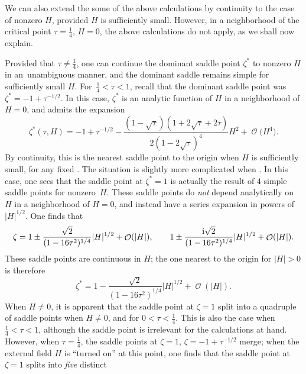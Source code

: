 \documentclass[pdftex]{sigma}
\DeclareMathOperator{\OO}{\mathcal{O}}
\numberwithin{equation}{section}
\begin{document}
\begin{Remark}
 We can also extend the some of the above calculations by continuity to the case of nonzero $H$, provided $H$ is sufficiently small. However, in a neighborhood of the critical point $\tau=\frac{1}{4}$, $H=0$, the above calculations do not apply, as we shall now explain.

 Provided that $\tau\neq \frac{1}{4}$, one can continue the dominant saddle point $\zeta^*$ to nonzero $H$ in an~unambiguous manner, and the dominant saddle remains simple for sufficiently small $H$. For~${\frac{1}{4}< \tau < 1}$,
 recall that the dominant saddle point was $\zeta^* = -1 + \tau^{-1/2}$. In this case, $\zeta^*$ is an analytic function of $H$ in a neighborhood of $H=0$, and admits the expansion
 \begin{equation*}
 \zeta^*(\tau,H) = -1 + \tau^{-1/2} - \frac{(1-\sqrt{\tau})(1+2\sqrt{\tau}+2\tau)}{2(1-2\sqrt{\tau})^4}H^2 + \OO\bigl(H^4\bigr).
 \end{equation*}
 By continuity, this is the nearest saddle point to the origin when $H$ is sufficiently small, for any fixed .
 The situation is slightly more complicated when . In this case, one sees that the saddle point at $\zeta^* = 1$ is actually the result of $4$ simple saddle points for nonzero~$H$. These saddle points do \textit{not} depend analytically on $H$ in a neighborhood of $H=0$, and instead have a series expansion in powers of $|H|^{1/2}$. One finds that
 \begin{equation*}
 \zeta = 1 \pm \frac{\sqrt{2}}{(1-16\tau^2)^{1/4}}|H|^{1/2} + \OO(|H|),\qquad 1 \pm \frac{{\rm i}\sqrt{2}}{(1-16\tau^2)^{1/4}}|H|^{1/2} + \OO(|H|).
 \end{equation*}
 These saddle points are continuous in $H$; the one nearest to the origin for $|H|>0$ is therefore
 \begin{equation*}
 \zeta^* = 1-\frac{\sqrt{2}}{(1-16\tau^2)^{1/4}}|H|^{1/2} + \OO(|H|).
 \end{equation*}
 When $H\neq 0$, it is apparent that the saddle point at $\zeta = 1$ split into a quadruple of saddle points when $H\neq 0$,
 and for $0 < \tau < \frac{1}{4}$. This is also the case when $\frac{1}{4} < \tau < 1$, although the saddle point is irrelevant for the
 calculations at hand. However, when $\tau = \frac{1}{4}$, the saddle points at $\zeta = 1$, $\zeta = -1 + \tau^{-1/2}$ merge; when the
 external field $H$ is ``turned on'' at this point, one finds that the saddle point at $\zeta= 1$ splits into \textit{five} distinct

\end{Remark}
\end{document}
